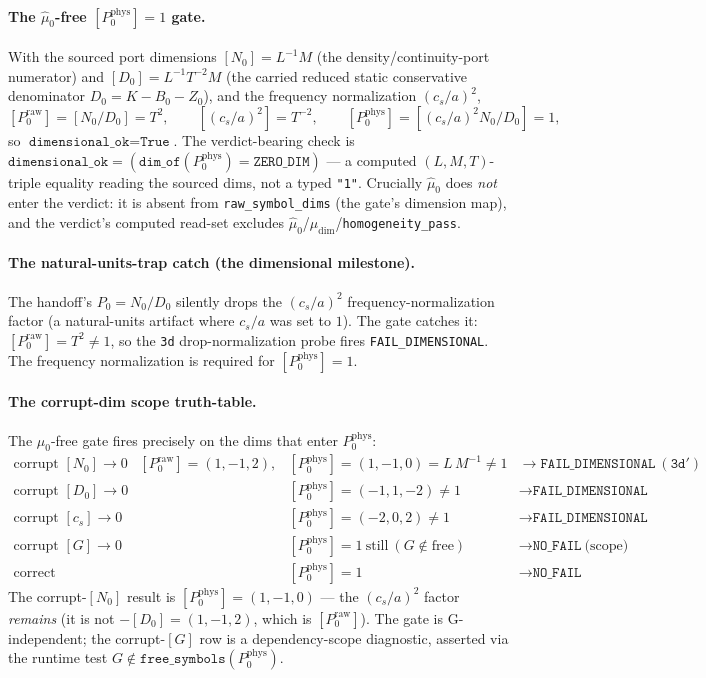 \paragraph{The \texorpdfstring{\(\hat\mu_0\)}{mu0}-free \texorpdfstring{\([P_0^{\mathrm{phys}}]=1\)}{[P0phys]=1} gate.}
With the sourced port dimensions \([N_0]=L^{-1}M\) (the density/continuity-port numerator) and
\([D_0]=L^{-1}T^{-2}M\) (the carried reduced static conservative denominator \(D_0=K-B_0-Z_0\)), and the
frequency normalization \((c_s/a)^2\),
\[
  [P_0^{\mathrm{raw}}]=[N_0/D_0]=T^2,\qquad
  [(c_s/a)^2]=T^{-2},\qquad
  [P_0^{\mathrm{phys}}]=[(c_s/a)^2N_0/D_0]=1,
\]
so \(\texttt{dimensional\_ok}=\texttt{True}\). The verdict-bearing check is
\(\texttt{dimensional\_ok}=(\texttt{dim\_of}(P_0^{\mathrm{phys}})=\texttt{ZERO\_DIM})\) --- a computed
\((L,M,T)\)-triple equality reading the sourced dims, not a typed \texttt{"1"}. Crucially \(\hat\mu_0\) does
\emph{not} enter the verdict: it is absent from \texttt{raw\_symbol\_dims} (the gate's dimension map), and
the verdict's computed read-set excludes \(\hat\mu_0\)/\(\mu_{\mathrm{dim}}\)/\texttt{homogeneity\_pass}.

\paragraph{The natural-units-trap catch (the dimensional milestone).}
The handoff's \(P_0=N_0/D_0\) silently drops the \((c_s/a)^2\) frequency-normalization factor (a
natural-units artifact where \(c_s/a\) was set to \(1\)). The gate catches it: \([P_0^{\mathrm{raw}}]=T^2\neq1\),
so the \texttt{3d} drop-normalization probe fires \texttt{FAIL\_DIMENSIONAL}. The frequency normalization is
required for \([P_0^{\mathrm{phys}}]=1\).

\paragraph{The corrupt-dim scope truth-table.}
The \(\hat\mu_0\)-free gate fires precisely on the dims that enter \(P_0^{\mathrm{phys}}\):
\[
\begin{array}{llll}
  \text{corrupt } [N_0]\to0 & [P_0^{\mathrm{raw}}]=(1,-1,2), & [P_0^{\mathrm{phys}}]=(1,-1,0)=L\,M^{-1}\neq1 & \to \texttt{FAIL\_DIMENSIONAL}\ (\texttt{3d}')\\
  \text{corrupt } [D_0]\to0 & & [P_0^{\mathrm{phys}}]=(-1,1,-2)\neq1 & \to \texttt{FAIL\_DIMENSIONAL}\\
  \text{corrupt } [c_s]\to0 & & [P_0^{\mathrm{phys}}]=(-2,0,2)\neq1 & \to \texttt{FAIL\_DIMENSIONAL}\\
  \text{corrupt } [G]\to0 & & [P_0^{\mathrm{phys}}]=1\ \text{still}\ (G\notin\text{free}) & \to \texttt{NO\_FAIL}\ \text{(scope)}\\
  \text{correct} & & [P_0^{\mathrm{phys}}]=1 & \to \texttt{NO\_FAIL}
\end{array}
\]
The corrupt-\([N_0]\) result is \([P_0^{\mathrm{phys}}]=(1,-1,0)\) --- the \((c_s/a)^2\) factor \emph{remains}
(it is not \(-[D_0]=(1,-1,2)\), which is \([P_0^{\mathrm{raw}}]\)). The gate is G-independent; the corrupt-\([G]\)
row is a dependency-scope diagnostic, asserted via the runtime test \(G\notin\texttt{free\_symbols}(P_0^{\mathrm{phys}})\).

